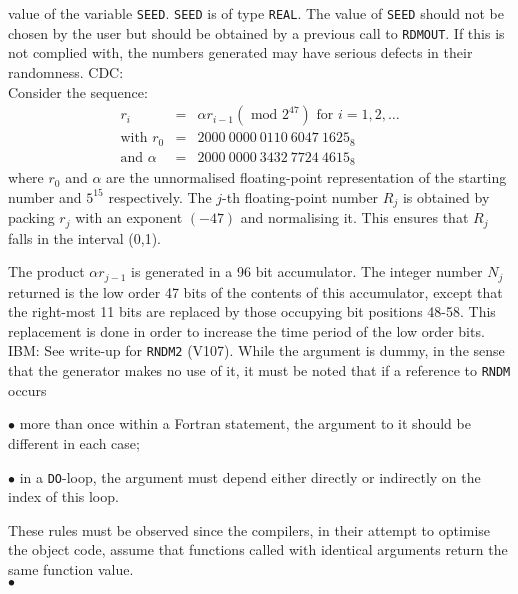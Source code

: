 value of the variable {\tt SEED}. {\tt SEED} is of type {\tt REAL}.
The value of {\tt SEED} should not be chosen by the user but should be
obtained by a previous call to {\tt RDMOUT}. If this is not complied
with, the numbers generated may have serious defects in their randomness.
\Method
CDC: \\
Consider the sequence:
\begin{eqnarray*}
r_i & = & \alpha r_{i-1}(\mbox{ mod } 2^{47})\mbox{ for } i=1,2,\ldots\\
\mbox{with } r_0   & = & 2000\ 0000\ 0110\ 6047\ 1625_8 \\
\mbox{and } \alpha & = & 2000\ 0000\ 3432\ 7724\ 4615_8
\end{eqnarray*}
where $r_0$ and $\alpha$ are the unnormalised floating-point
representation of the starting number and $5^{15}$ respectively.
The $j$-th floating-point number $R_j$ is obtained by packing $r_j$
with an exponent $(-47)$ and normalising it. This ensures that $R_j$
falls in the interval (0,1).
\par
The product $\alpha r_{j-1}$ is generated in a 96 bit accumulator.
The integer number $N_j$ returned is the low order 47 bits of the
contents of this accumulator, except that the right-most 11 bits are
replaced by those occupying bit positions 48-58. This replacement is
done in order to increase the time period of the low order bits.\\[2mm]
IBM:
See write-up for {\tt RNDM2} (V107).
\Notes
While the argument is dummy, in the sense that the generator makes no
use of it, it must be noted that if a reference to {\tt RNDM} occurs
\begin{DLtt}{12}
\item[$\bullet$] more than once within a Fortran statement, the
argument to it should be different in each case;
\item[$\bullet$] in a {\tt DO}-loop, the argument must depend either
directly or indirectly on the index of this loop.
\end{DLtt}
These rules must be observed since the compilers, in their
attempt to optimise the object code, assume that functions called
with identical arguments return the same function value.
\\ $\bullet$
